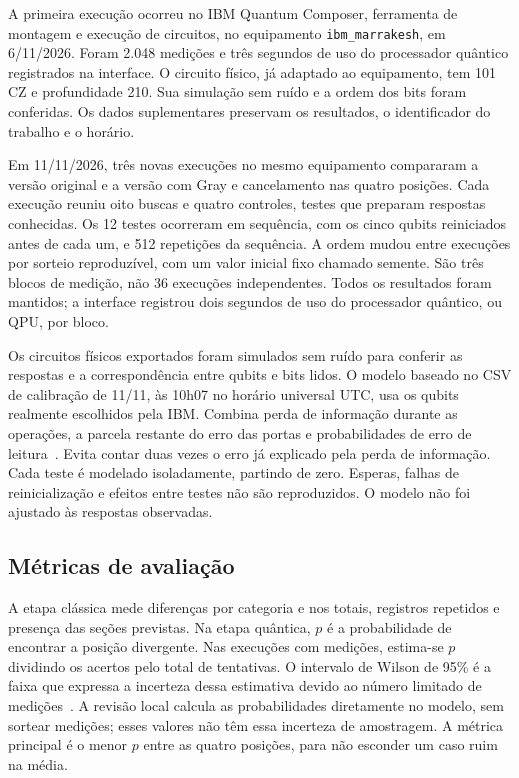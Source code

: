 \documentclass[conference]{IEEEtran}
\begin{document}
A primeira execução ocorreu no IBM Quantum Composer, ferramenta de montagem e execução de circuitos, no equipamento \texttt{ibm\_marrakesh}, em 6/11/2026. Foram 2.048 medições e três segundos de uso do processador quântico registrados na interface. O circuito físico, já adaptado ao equipamento, tem 101 CZ e profundidade 210. Sua simulação sem ruído e a ordem dos bits foram conferidas. Os dados suplementares preservam os resultados, o identificador do trabalho e o horário.

Em 11/11/2026, três novas execuções no mesmo equipamento compararam a versão original e a versão com Gray e cancelamento nas quatro posições. Cada execução reuniu oito buscas e quatro controles, testes que preparam respostas conhecidas. Os 12 testes ocorreram em sequência, com os cinco qubits reiniciados antes de cada um, e 512 repetições da sequência. A ordem mudou entre execuções por sorteio reproduzível, com um valor inicial fixo chamado semente. São três blocos de medição, não 36 execuções independentes. Todos os resultados foram mantidos; a interface registrou dois segundos de uso do processador quântico, ou QPU, por bloco.

Os circuitos físicos exportados foram simulados sem ruído para conferir as respostas e a correspondência entre qubits e bits lidos. O modelo baseado no CSV de calibração de 11/11, às 10h07 no horário universal UTC, usa os qubits realmente escolhidos pela IBM. Combina perda de informação durante as operações, a parcela restante do erro das portas e probabilidades de erro de leitura~\cite{aerDeviceNoise}. Evita contar duas vezes o erro já explicado pela perda de informação. Cada teste é modelado isoladamente, partindo de zero. Esperas, falhas de reinicialização e efeitos entre testes não são reproduzidos. O modelo não foi ajustado às respostas observadas.

\subsection{Métricas de avaliação}
A etapa clássica mede diferenças por categoria e nos totais, registros repetidos e presença das seções previstas. Na etapa quântica, $p$ é a probabilidade de encontrar a posição divergente. Nas execuções com medições, estima-se $p$ dividindo os acertos pelo total de tentativas. O intervalo de Wilson de 95\% é a faixa que expressa a incerteza dessa estimativa devido ao número limitado de medições~\cite{nistWilson}. A revisão local calcula as probabilidades diretamente no modelo, sem sortear medições; esses valores não têm essa incerteza de amostragem. A métrica principal é o menor $p$ entre as quatro posições, para não esconder um caso ruim na média.
\end{document}
